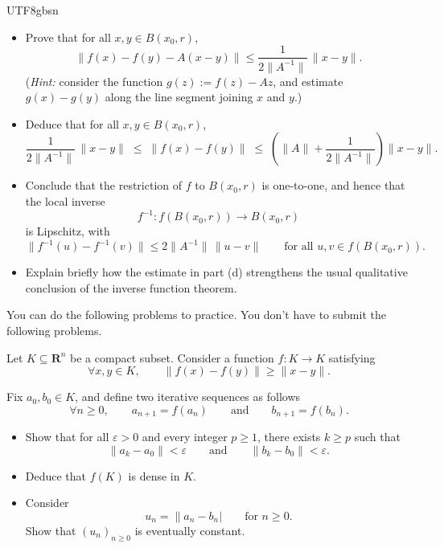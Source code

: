 \documentclass[addpoints]{exam}
\theoremstyle{definition}
\begin{document}
\begin{CJK*}{UTF8}{gbsn}
\begin{questions}
\begin{itemize}
\item[(b)] Prove that for all \(x,y\in B(x_0,r)\),
$$
\|f(x)-f(y)-A(x-y)\|
\le
\frac{1}{2\|A^{-1}\|}\,\|x-y\|.
$$
(\emph{Hint:} consider the function \(g(z):=f(z)-Az\), and estimate \(g(x)-g(y)\) along the line segment joining \(x\) and \(y\).)

\item[(c)] Deduce that for all \(x,y\in B(x_0,r)\),
$$
\frac{1}{2\|A^{-1}\|}\,\|x-y\|
\;\le\;
\|f(x)-f(y)\|
\;\le\;
\left(\|A\|+\frac{1}{2\|A^{-1}\|}\right)\|x-y\|.
$$

\item[(d)] Conclude that the restriction of \(f\) to \(B(x_0,r)\) is one-to-one, and hence that the local inverse
$$
f^{-1}:f(B(x_0,r))\to B(x_0,r)
$$
is Lipschitz, with
$$
\|f^{-1}(u)-f^{-1}(v)\|
\le
2\|A^{-1}\|\,\|u-v\|
\qquad
\text{for all }u,v\in f(B(x_0,r)).
$$

\item[(e)] Explain briefly how the estimate in part (d) strengthens the usual qualitative conclusion of the inverse function theorem.
\end{itemize}
\begin{solution} 

\end{solution}


\end{questions}

You can do the following problems to practice. You don't have to submit the following problems.

\begin{questions}

\question   Let  \(K\subseteq \mathbf{R}^n \) be a compact subset. Consider a function \(f:K\to K\) satisfying
\[
\forall x,y\in K,\qquad \|f(x)-f(y)\|\ge \|x-y\|.
\]

Fix \(a_0,b_0\in K\), and define two iterative sequences as follows
\[
\forall n\ge 0,\qquad a_{n+1}=f(a_n)\qquad\text{and}\qquad b_{n+1}=f(b_n).
\]

\begin{itemize}
\item[(1)] Show that for all \(\varepsilon>0\) and every integer \(p\ge 1\), there exists \(k\ge p\) such that
\[
\|a_k-a_0\|<\varepsilon
\qquad\text{and}\qquad
\|b_k-b_0\|<\varepsilon.
\]

\item[(2)] Deduce  that \(f(K)\) is dense in \(K\).

\item[(3)] Consider
\[
u_n=\|a_n-b_n|\qquad\text{for }n\ge 0.
\]
Show that \((u_n)_{n\ge 0}\) is eventually constant.


\end{itemize}
\end{questions}
\end{CJK*}
\end{document}
